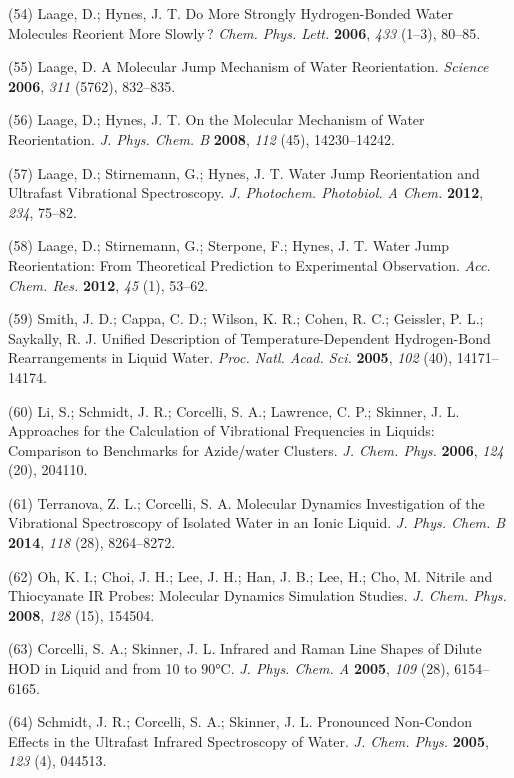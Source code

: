 (54) Laage, D.; Hynes, J. T. Do More Strongly Hydrogen-Bonded Water Molecules Reorient More Slowly\,? \emph{Chem. Phys. Lett.}  \textbf{2006}, \emph{433} (1--3), 80--85.

(55) Laage, D. A Molecular Jump Mechanism of Water Reorientation.  \emph{Science} \textbf{2006}, \emph{311} (5762), 832--835.

(56) Laage, D.; Hynes, J. T. On the Molecular Mechanism of Water Reorientation. \emph{J. Phys. Chem. B} \textbf{2008}, \emph{112} (45), 14230--14242.

(57) Laage, D.; Stirnemann, G.; Hynes, J. T. Water Jump Reorientation and Ultrafast Vibrational Spectroscopy. \emph{J. Photochem. Photobiol. A Chem.} \textbf{2012}, \emph{234}, 75--82.

(58) Laage, D.; Stirnemann, G.; Sterpone, F.; Hynes, J. T. Water Jump Reorientation: From Theoretical Prediction to Experimental Observation.  \emph{Acc. Chem. Res.} \textbf{2012}, \emph{45} (1), 53--62.

(59) Smith, J. D.; Cappa, C. D.; Wilson, K. R.; Cohen, R. C.; Geissler, P. L.; Saykally, R. J. Unified Description of Temperature-Dependent Hydrogen-Bond Rearrangements in Liquid Water. \emph{Proc. Natl. Acad.  Sci.} \textbf{2005}, \emph{102} (40), 14171--14174.

(60) Li, S.; Schmidt, J. R.; Corcelli, S. A.; Lawrence, C. P.; Skinner, J. L. Approaches for the Calculation of Vibrational Frequencies in Liquids: Comparison to Benchmarks for Azide/water Clusters. \emph{J.  Chem. Phys.} \textbf{2006}, \emph{124} (20), 204110.

(61) Terranova, Z. L.; Corcelli, S. A. Molecular Dynamics Investigation of the Vibrational Spectroscopy of Isolated Water in an Ionic Liquid.  \emph{J. Phys. Chem. B} \textbf{2014}, \emph{118} (28), 8264--8272.

(62) Oh, K. I.; Choi, J. H.; Lee, J. H.; Han, J. B.; Lee, H.; Cho, M.  Nitrile and Thiocyanate IR Probes: Molecular Dynamics Simulation Studies. \emph{J. Chem. Phys.} \textbf{2008}, \emph{128} (15), 154504.

(63) Corcelli, S. A.; Skinner, J. L. Infrared and Raman Line Shapes of Dilute HOD in Liquid  and  from 10 to 90°C. \emph{J. Phys. Chem. A} \textbf{2005}, \emph{109} (28), 6154--6165.

(64) Schmidt, J. R.; Corcelli, S. A.; Skinner, J. L. Pronounced Non-Condon Effects in the Ultrafast Infrared Spectroscopy of Water.  \emph{J. Chem. Phys.} \textbf{2005}, \emph{123} (4), 044513.

